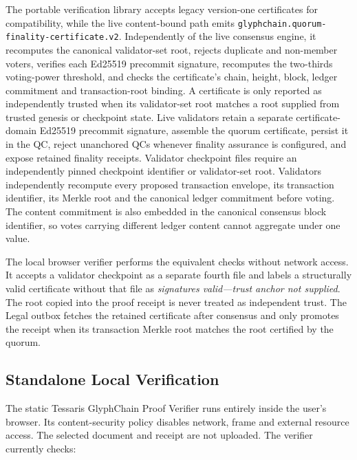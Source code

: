 The portable verification library accepts legacy version-one certificates for
compatibility, while the live content-bound path emits
\texttt{glyphchain.quorum-finality-certificate.v2}.  Independently of the live
consensus engine, it recomputes the canonical validator-set root, rejects
duplicate and non-member voters, verifies each Ed25519 precommit signature,
recomputes the two-thirds voting-power threshold, and checks the certificate's
chain, height, block, ledger commitment and transaction-root binding.  A
certificate is only reported as independently
trusted when its validator-set root matches a root supplied from trusted genesis
or checkpoint state.  Live validators retain a separate certificate-domain
Ed25519 precommit signature, assemble the quorum certificate, persist it in the
QC, reject unanchored QCs whenever finality assurance is configured, and expose
retained finality receipts.  Validator checkpoint files require an independently
pinned checkpoint identifier or validator-set root.  Validators independently
recompute every proposed transaction envelope, its transaction identifier, its
Merkle root and the canonical ledger commitment before voting.  The content
commitment is also embedded in the canonical consensus block identifier, so
votes carrying different ledger content cannot aggregate under one value.

The local browser verifier performs the equivalent checks without network
access.  It accepts a validator checkpoint as a separate fourth file and labels
a structurally valid certificate without that file as
\emph{signatures valid---trust anchor not supplied}.  The root copied into the
proof receipt is never treated as independent trust.  The Legal outbox fetches
the retained certificate after consensus and only promotes the receipt when its
transaction Merkle root matches the root certified by the quorum.

\subsection{Standalone Local Verification}

The static Tessaris GlyphChain Proof Verifier runs entirely inside the user's
browser.  Its content-security policy disables network, frame and external
resource access.  The selected document and receipt are not uploaded.  The
verifier currently checks:

